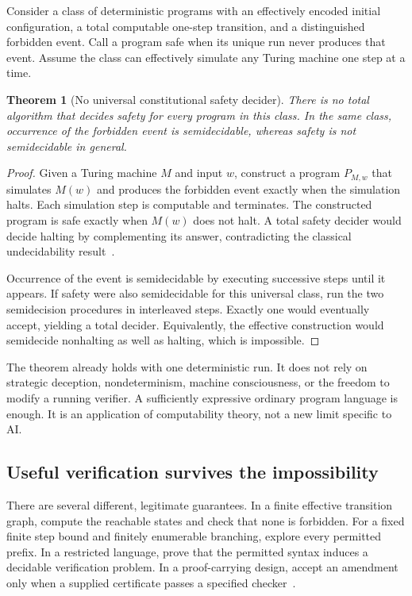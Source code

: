\documentclass[11pt,letterpaper]{article}
\theoremstyle{plain}
\newtheorem{theorem}[proposition]{Theorem}
\theoremstyle{definition}
\theoremstyle{remark}
\begin{document}
Consider a class of deterministic programs with an effectively encoded initial configuration, a total computable one-step transition, and a distinguished forbidden event. Call a program safe when its unique run never produces that event. Assume the class can effectively simulate any Turing machine one step at a time.

\begin{theorem}[No universal constitutional safety decider]\label{thm:undecidable}
There is no total algorithm that decides safety for every program in this class. In the same class, occurrence of the forbidden event is semidecidable, whereas safety is not semidecidable in general.
\end{theorem}
\begin{proof}
Given a Turing machine $M$ and input $w$, construct a program $P_{M,w}$ that simulates $M(w)$ and produces the forbidden event exactly when the simulation halts. Each simulation step is computable and terminates. The constructed program is safe exactly when $M(w)$ does not halt. A total safety decider would decide halting by complementing its answer, contradicting the classical undecidability result~\cite{turing}.

Occurrence of the event is semidecidable by executing successive steps until it appears. If safety were also semidecidable for this universal class, run the two semidecision procedures in interleaved steps. Exactly one would eventually accept, yielding a total decider. Equivalently, the effective construction would semidecide nonhalting as well as halting, which is impossible.
\end{proof}

The theorem already holds with one deterministic run. It does not rely on strategic deception, nondeterminism, machine consciousness, or the freedom to modify a running verifier. A sufficiently expressive ordinary program language is enough. It is an application of computability theory, not a new limit specific to AI.

\subsection{Useful verification survives the impossibility}
There are several different, legitimate guarantees. In a finite effective transition graph, compute the reachable states and check that none is forbidden. For a fixed finite step bound and finitely enumerable branching, explore every permitted prefix. In a restricted language, prove that the permitted syntax induces a decidable verification problem. In a proof-carrying design, accept an amendment only when a supplied certificate passes a specified checker~\cite{necula}.
\end{document}
